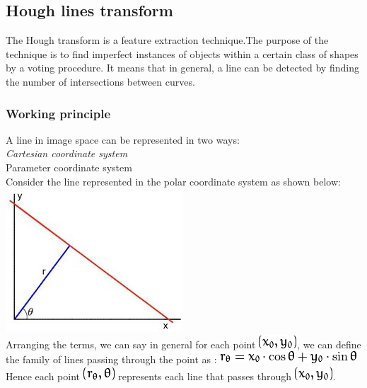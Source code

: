 \documentclass[]{article}
\begin{document}
\subsection{Hough lines transform}\label{hough-lines-transform}

The Hough transform is a feature extraction technique.The purpose of the
technique is to find imperfect instances of objects within a certain
class of shapes by a voting procedure. It means that in general, a line
can be detected by finding the number of intersections between curves.

\subsubsection{Working principle}\label{working-principle}

A line in image space can be represented in two ways:\\
\emph{Cartesian coordinate system\\
}Parameter coordinate system\\
Consider the line represented in the polar coordinate system as shown
below:\\
\includegraphics{images/Line_Detection/Hough Lines/polar.jpg}\\
Arranging the terms, we can say in general for each point
\includegraphics{images/Line_Detection/Hough Lines/xy.png}, we can
define the family of lines passing through the point as :
\includegraphics{images/Line_Detection/Hough Lines/rcos.png} Hence each
point \includegraphics{images/Line_Detection/Hough Lines/r0.png}
represents each line that passes through
\includegraphics{images/Line_Detection/Hough Lines/xy.png}.
\end{document}

